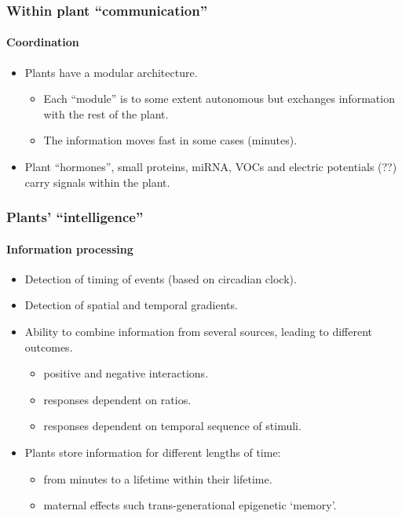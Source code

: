 \documentclass[utf8]{beamer}\usepackage[]{graphicx}\usepackage[]{color} %
\begin{document}
\begin{frame}[<+->]
  \frametitle{Within plant ``communication''}
  \framesubtitle{Coordination}
  \begin{itemize}
    \item Plants have a modular architecture.
    \begin{itemize}
      \item Each ``module'' is to some extent autonomous but exchanges information with the rest of the plant.
      \item The information moves fast in some cases (minutes).
    \end{itemize}
    \item Plant ``hormones'', small proteins, miRNA, VOCs and electric potentials (??) carry signals within the plant.
  \end{itemize}
\end{frame}

\begin{frame}[<+->]
  \frametitle{Plants' ``intelligence''}
  \framesubtitle{Information processing}
  \begin{itemize}
     \item Detection of timing of events (based on circadian clock).
    \item Detection of spatial and temporal gradients.
     \item Ability to combine information from several sources, leading to different outcomes.
     \begin{itemize}
       \item positive and negative interactions.
       \item responses dependent on ratios.
       \item responses dependent on temporal sequence of stimuli.
     \end{itemize}
    \item Plants store information for different lengths of time:
    \begin{itemize}
      \item from minutes to a lifetime within their lifetime.
      \item maternal effects such trans-generational epigenetic `memory'.
    \end{itemize}
  \end{itemize}
\end{frame}
\end{document}
